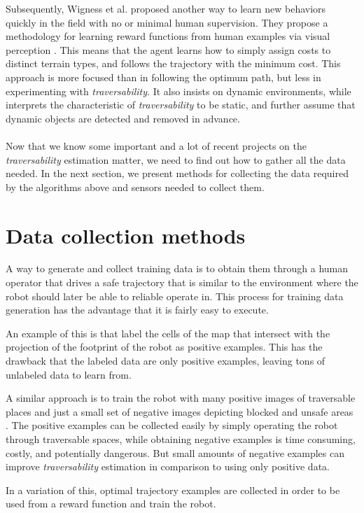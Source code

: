 \documentclass[12pt,a4paper]{report}
\newcommand{\etal}[1]{#1 et al.}
\newcommand{\term}{\textit}
\begin{document}
	Subsequently, \etal{Wigness} proposed another way to learn new behaviors quickly 
	in the field with no or minimal human supervision. They propose a methodology 
	for learning reward functions from human examples via visual perception 
	\cite{Wigness}. This means that the agent learns how to simply assign costs to 
	distinct terrain types, and follows the trajectory with the minimum cost. This 
	approach is more focused than \cite{Suger} in following the optimum path, but 
	less in experimenting with \term{traversability}. It also insists on dynamic 
	environments, while \cite{Suger} interprets the characteristic of 
	\term{traversability} to be static, and further assume that dynamic objects are 
	detected and removed in advance.
	\\\\
	
	
	Now that we know some important and a lot of recent projects on the 
	\term{traversability} estimation matter, we need to find out how to gather all 
	the data needed. In the next section, we present methods for collecting the data 
	required by the algorithms above and sensors needed to collect them.
	\\
	
	\section{Data collection methods}
	\label{sec:bg:data}
	
	A way to generate and collect training data is to obtain them through a human 
	operator that drives a safe trajectory that is similar to the environment where 
	the robot should later be able to reliable operate in. This process for training 
	data generation has the advantage that it is fairly easy to execute.
	\par 
	An example of this is \cite{Suger} that label the cells of the map that 
	intersect with the projection of the footprint of the robot as positive examples. 
	This has the drawback that the labeled data are only positive examples, leaving 
	tons of unlabeled data to learn from.
	\par
	A similar approach is to train the robot with many positive images of traversable 
	places and just a small set of negative	images depicting blocked and unsafe areas 
	\cite{HiroseGonet}. The positive examples can be collected easily by simply 
	operating the robot through traversable spaces, while obtaining negative examples 
	is time consuming, costly, and potentially dangerous. But small amounts of 
	negative examples can improve \term{traversability} estimation in comparison to 
	using only positive data.
	\par 
	In a variation of this, optimal trajectory examples are collected \cite{Wigness} 
	in order to be used from a reward function and train the robot.
	\\
	
\end{document}
